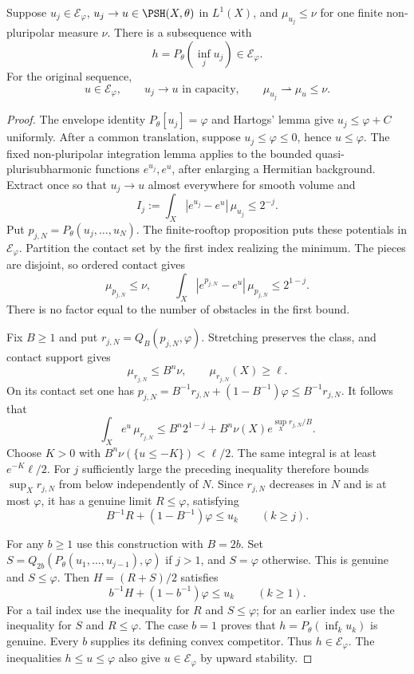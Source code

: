 \begin{theorem}\label{thm:big-relative-fixed-continuity}
Suppose $u_j\in\mathcal E_\varphi$, $u_j\to u\in\PSH(X,\theta)$ in $L^1(X)$, and $\mu_{u_j}\leq\nu$ for one finite non-pluripolar measure $\nu$. There is a subsequence with
\[
 h=P_\theta\left(\inf_j u_j\right)\in\mathcal E_\varphi.
\]
For the original sequence,
\[
 u\in\mathcal E_\varphi,\qquad
 u_j\longrightarrow u\text{ in capacity},\qquad
 \mu_{u_j}\rightharpoonup\mu_u\leq\nu.
\]
\end{theorem}
\begin{proof}
The envelope identity $P_\theta[u_j]=\varphi$ and Hartogs' lemma give $u_j\leq\varphi+C$ uniformly. After a common translation, suppose $u_j\leq\varphi\leq0$, hence $u\leq\varphi$. The fixed non-pluripolar integration lemma applies to the bounded quasi-plurisubharmonic functions $e^{u_j},e^u$, after enlarging a Hermitian background. Extract once so that $u_j\to u$ almost everywhere for smooth volume and
\[
 I_j:=\int_X|e^{u_j}-e^u|\,\mu_{u_j}\leq2^{-j}.
\]
Put $p_{j,N}=P_\theta(u_j,\ldots,u_N)$. The finite-rooftop proposition puts these potentials in $\mathcal E_\varphi$. Partition the contact set by the first index realizing the minimum. The pieces are disjoint, so ordered contact gives
\begin{equation}\label{eq:big-finite-roof-domination}
 \mu_{p_{j,N}}\leq\nu,\qquad
 \int_X|e^{p_{j,N}}-e^u|\,\mu_{p_{j,N}}\leq2^{1-j}.
\end{equation}
There is no factor equal to the number of obstacles in the first bound.

Fix $B\geq1$ and put $r_{j,N}=Q_B(p_{j,N},\varphi)$. Stretching preserves the class, and contact support gives
\[
 \mu_{r_{j,N}}\leq B^n\nu,\qquad
 \mu_{r_{j,N}}(X)\geq\ell.
\]
On its contact set one has
$p_{j,N}=B^{-1}r_{j,N}+(1-B^{-1})\varphi\leq B^{-1}r_{j,N}$.
It follows that
\[
 \int_Xe^u\,\mu_{r_{j,N}}
 \leq B^n2^{1-j}+B^n\nu(X)e^{\sup_Xr_{j,N}/B}.
\]
Choose $K>0$ with $B^n\nu(\{u\leq-K\})<\ell/2$. The same integral is at least $e^{-K}\ell/2$. For $j$ sufficiently large the preceding inequality therefore bounds $\sup_Xr_{j,N}$ from below independently of $N$. Since $r_{j,N}$ decreases in $N$ and is at most $\varphi$, it has a genuine limit $R\leq\varphi$, satisfying
\[
 B^{-1}R+(1-B^{-1})\varphi\leq u_k\qquad(k\geq j).
\]

For any $b\geq1$ use this construction with $B=2b$. Set
$S=Q_{2b}(P_\theta(u_1,\ldots,u_{j-1}),\varphi)$ if $j>1$, and $S=\varphi$ otherwise. This is genuine and $S\leq\varphi$. Then $H=(R+S)/2$ satisfies
\[
 b^{-1}H+(1-b^{-1})\varphi\leq u_k\qquad(k\geq1).
\]
For a tail index use the inequality for $R$ and $S\leq\varphi$; for an earlier index use the inequality for $S$ and $R\leq\varphi$. The case $b=1$ proves that $h=P_\theta(\inf_k u_k)$ is genuine. Every $b$ supplies its defining convex competitor. Thus $h\in\mathcal E_\varphi$. The inequalities $h\leq u\leq\varphi$ also give $u\in\mathcal E_\varphi$ by upward stability.


\end{proof}
